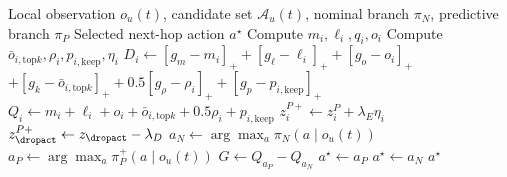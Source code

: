 \begin{algorithm}[t]
\caption{\method\ Local Routing Decision}
\label{alg:risk_switch}
\begin{algorithmic}[1]
\Require Local observation $o_u(t)$, candidate set $\mathcal{A}_u(t)$, nominal branch $\pi_N$, predictive branch $\pi_P$
\Ensure Selected next-hop action $a^\star$
    \State Compute $m_i,\ell_i,q_i,o_i$
    \State Compute $\bar{o}_{i,\mathrm{top}k},\rho_i,p_{i,\mathrm{keep}},\eta_i$
    \State $D_i \gets [g_m-m_i]_+ + [g_\ell-\ell_i]_+ + [g_o-o_i]_+$
    \Statex \hspace{\algorithmicindent} $+[g_k-\bar{o}_{i,\mathrm{top}k}]_+ + 0.5[g_\rho-\rho_i]_+ + [g_p-p_{i,\mathrm{keep}}]_+$
    \State $Q_i \gets m_i+\ell_i+o_i+\bar{o}_{i,\mathrm{top}k}+0.5\rho_i+p_{i,\mathrm{keep}}$
    \State $z_i^{P+} \gets z_i^P+\lambda_E\eta_i$
\EndFor
{}
    \State $z_{\dropact}^{P+}\gets z_{\dropact}-\lambda_D$
\EndIf
\State $a_N \gets \arg\max_a \pi_N(a\mid o_u(t))$
\State $a_P \gets \arg\max_a \pi_P^{+}(a\mid o_u(t))$
\State $G \gets Q_{a_P}-Q_{a_N}$
    \State $a^\star \gets a_P$
\Else
    \State $a^\star \gets a_N$
\EndIf
\State \Return $a^\star$
\end{algorithmic}
\end{algorithm}
